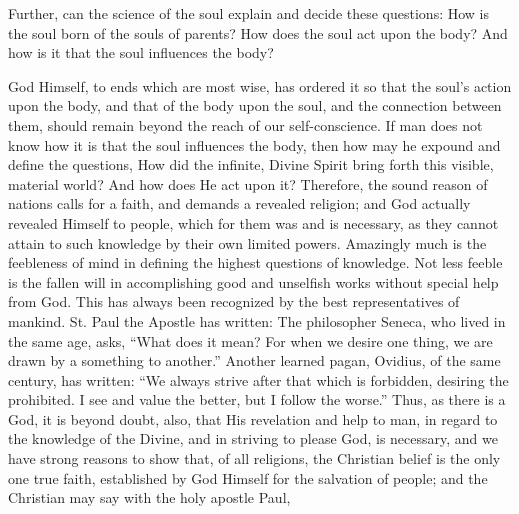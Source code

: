 Further, can the science of the soul explain and decide these questions: How is the soul born of the souls of parents? How does the soul act upon the body? And how is it that the soul influences the body?

God Himself, to ends which are most wise, has ordered it so that the soul's action upon the body, and that of the body upon the soul, and the connection between them, should remain beyond the reach of our self-conscience. If man does not know how it is that the soul influences the body, then how may he expound and define the questions, How did the infinite, Divine Spirit bring forth this visible, material world? And how does He act upon it? Therefore, the sound reason of nations calls for a faith, and demands a revealed religion; and God actually revealed Himself to people, which for them was and is necessary, as they cannot attain to such knowledge by their own limited powers. Amazingly much is the feebleness of mind in defining the highest questions of knowledge. Not less feeble is the fallen will in accomplishing good and unselfish works without special help from God. This has always been recognized by the best representatives of mankind. St. Paul the Apostle has written:  The philosopher Seneca, who lived in the same age, asks, ``What does it mean? For when we desire one thing, we are drawn by a something to another.'' Another learned pagan, Ovidius, of the same century, has written: ``We always strive after that which is forbidden, desiring the prohibited. I see and value the better, but I follow the worse.'' Thus, as there is a God, it is beyond doubt, also, that His revelation and help to man, in regard to the knowledge of the Divine, and in striving to please God, is necessary, and we have strong reasons to show that, of all religions, the Christian belief is the only one true faith, established by God Himself for the salvation of people; and the Christian may say with the holy apostle Paul, 

